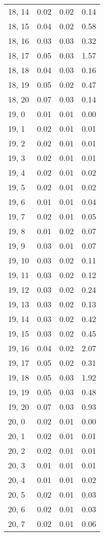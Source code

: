 \begin{table}
\begin{tabular}{llll}
18, 14 &  0.02 &  0.02 &  0.14 \\
18, 15 &  0.04 &  0.02 &  0.58 \\
18, 16 &  0.03 &  0.03 &  0.32 \\
18, 17 &  0.05 &  0.03 &  1.57 \\
18, 18 &  0.04 &  0.03 &  0.16 \\
18, 19 &  0.05 &  0.02 &  0.47 \\
18, 20 &  0.07 &  0.03 &  0.14 \\
19, 0  &  0.01 &  0.01 &  0.00 \\
19, 1  &  0.02 &  0.01 &  0.01 \\
19, 2  &  0.02 &  0.01 &  0.01 \\
19, 3  &  0.02 &  0.01 &  0.01 \\
19, 4  &  0.02 &  0.01 &  0.02 \\
19, 5  &  0.02 &  0.01 &  0.02 \\
19, 6  &  0.01 &  0.01 &  0.04 \\
19, 7  &  0.02 &  0.01 &  0.05 \\
19, 8  &  0.01 &  0.02 &  0.07 \\
19, 9  &  0.03 &  0.01 &  0.07 \\
19, 10 &  0.03 &  0.02 &  0.11 \\
19, 11 &  0.03 &  0.02 &  0.12 \\
19, 12 &  0.03 &  0.02 &  0.24 \\
19, 13 &  0.03 &  0.02 &  0.13 \\
19, 14 &  0.03 &  0.02 &  0.42 \\
19, 15 &  0.03 &  0.02 &  0.45 \\
19, 16 &  0.04 &  0.02 &  2.07 \\
19, 17 &  0.05 &  0.02 &  0.31 \\
19, 18 &  0.05 &  0.03 &  1.92 \\
19, 19 &  0.05 &  0.03 &  0.48 \\
19, 20 &  0.07 &  0.03 &  0.93 \\
20, 0  &  0.02 &  0.01 &  0.00 \\
20, 1  &  0.02 &  0.01 &  0.01 \\
20, 2  &  0.02 &  0.01 &  0.01 \\
20, 3  &  0.01 &  0.01 &  0.01 \\
20, 4  &  0.01 &  0.01 &  0.02 \\
20, 5  &  0.02 &  0.01 &  0.03 \\
20, 6  &  0.02 &  0.01 &  0.03 \\
20, 7  &  0.02 &  0.01 &  0.06 \\

\end{tabular}
\end{table}
